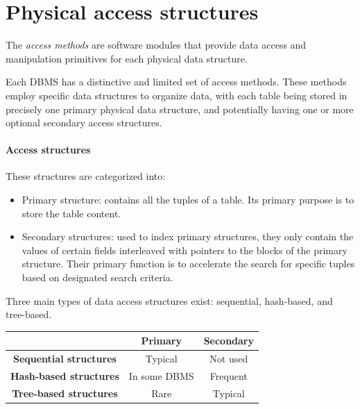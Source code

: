 \section{Physical access structures}

\begin{definition}
    The \emph{access methods} are software modules that provide data access and manipulation primitives for each physical data structure. 
\end{definition}
Each DBMS has a distinctive and limited set of access methods. 
These methods employ specific data structures to organize data, with each table being stored in precisely one primary physical data structure, and potentially having one or more optional secondary access structures.

\paragraph*{Access structures}
These structures are categorized into: 
\begin{itemize}
    \item Primary structure: contains all the tuples of a table. 
        Its primary purpose is to store the table content. 
    \item Secondary structures: used to index primary structures, they only contain the values of certain fields interleaved with pointers to the blocks of the primary structure. 
    Their primary function is to accelerate the search for specific tuples based on designated search criteria.
\end{itemize}
Three main types of data access structures exist: sequential, hash-based, and tree-based.
\begin{table}[H]
    \centering
    \begin{tabular}{c|cc|}
    \cline{2-3}
                                                         & \textbf{Primary} & \textbf{Secondary} \\ \hline
    \multicolumn{1}{|c|}{\textbf{Sequential structures}} & Typical          & Not used           \\
    \multicolumn{1}{|c|}{\textbf{Hash-based structures}} & In some DBMS     & Frequent           \\
    \multicolumn{1}{|c|}{\textbf{Tree-based structures}} & Rare             & Typical            \\ \hline
    \end{tabular}
\end{table}

